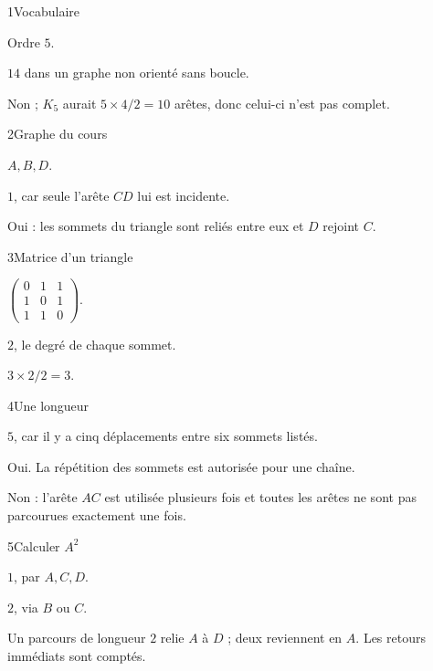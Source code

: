 \begin{corrige}{1}{Vocabulaire}
\begin{questions}
\item Ordre $5$.
\item $14$ dans un graphe non orienté sans boucle.
\item Non ; $K_5$ aurait $5\times4/2=10$ arêtes, donc celui-ci n’est pas complet.
\end{questions}
\end{corrige}
\begin{corrige}{2}{Graphe du cours}
\begin{questions}
\item $A,B,D$.
\item $1$, car seule l’arête $CD$ lui est incidente.
\item Oui : les sommets du triangle sont reliés entre eux et $D$ rejoint $C$.
\end{questions}
\end{corrige}
\begin{corrige}{3}{Matrice d’un triangle}
\begin{questions}
\item $\begin{pmatrix}0&1&1\\1&0&1\\1&1&0\end{pmatrix}$.
\item $2$, le degré de chaque sommet.
\item $3\times2/2=3$.
\end{questions}
\end{corrige}
\begin{corrige}{4}{Une longueur}
\begin{questions}
\item $5$, car il y a cinq déplacements entre six sommets listés.
\item Oui. La répétition des sommets est autorisée pour une chaîne.
\item Non : l’arête $AC$ est utilisée plusieurs fois et toutes les arêtes ne sont pas parcourues exactement une fois.
\end{questions}
\end{corrige}
\begin{corrige}{5}{Calculer $A^2$}
\begin{questions}
\item $1$, par $A,C,D$.
\item $2$, via $B$ ou $C$.
\item Un parcours de longueur $2$ relie $A$ à $D$ ; deux reviennent en $A$. Les retours immédiats sont comptés.
\end{questions}
\end{corrige}
